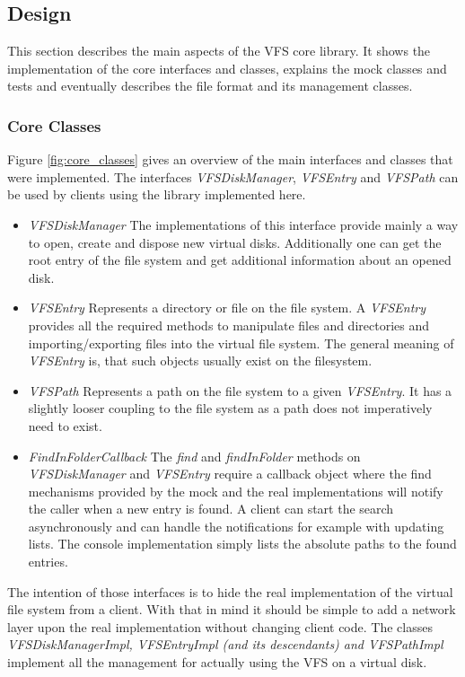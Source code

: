 \subsection{Design}
This section describes the main aspects of the VFS core library. It shows the
implementation of the core interfaces and classes, explains the mock classes and
tests and eventually describes the file format and its management classes.

\subsubsection{Core Classes}\label{sec:coreClasses}
Figure \ref{fig:core_classes} gives an overview of the main interfaces and
classes that were implemented. The interfaces \textit{VFSDiskManager},
\textit{VFSEntry} and \textit{VFSPath} can be used by clients using the library
implemented here.
\begin{itemize}
\item{\textit{VFSDiskManager}} The implementations of this interface provide
mainly a way to open, create and dispose new virtual disks. Additionally one can
get the root entry of the file system and get additional information about an
opened disk.
\item{\textit{VFSEntry}} Represents a directory or file on the file system. A
\textit{VFSEntry} provides all the required methods to manipulate files and
directories and importing/exporting files into the virtual file system. The
general meaning of \textit{VFSEntry} is, that such objects usually exist on the
filesystem.
\item {\textit{VFSPath}} Represents a path on the file system to a given
\textit{VFSEntry}. It has a slightly looser coupling to the file system as a
path does not imperatively need to exist.
\item {\textit{FindInFolderCallback}} The \textit{find} and
\textit{findInFolder} methods on \textit{VFSDiskManager} and \textit{VFSEntry}
require a callback object where the find mechanisms provided by the mock and the
real implementations will notify the caller when a new entry is found. A
client can start the search asynchronously and can handle the notifications for
example with updating lists. The console implementation simply lists the
absolute paths to the found entries.
\end{itemize}

The intention of those interfaces is to hide the real implementation of the
virtual file system from a client. With that in mind it should be simple to add
a network layer upon the real implementation without changing client code. The
classes \textit{VFSDiskManagerImpl, VFSEntryImpl (and its descendants) and
VFSPathImpl} implement all the management for actually using the VFS on a virtual disk.

